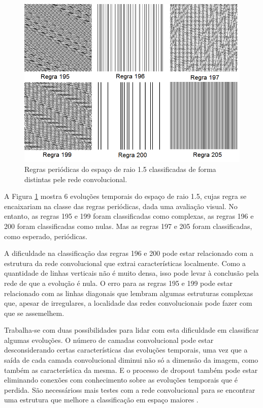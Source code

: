 \documentclass[12pt,a4paper]{report}
\begin{document}
	\begin{figure}[H]
		\centering
		\includegraphics[scale=0.75]{./img/regras_periodicas_diferentes_classificacoes.png}
		\caption{Regras periódicas do espaço de raio 1.5 classificadas de forma distintas pele rede convolucional.}
		\label{fig:PeriodicasDiferentesClassificacoes}
	\end{figure}
	
	A Figura \ref{fig:PeriodicasDiferentesClassificacoes} mostra 6 evoluções temporais do espaço de raio 1.5, cujas regra se encaixariam na classe das regras periódicas, dada uma avaliação visual. No entanto, as regras 195 e 199 foram classificadas como complexas, as regras 196 e 200 foram classificadas como nulas. Mas as regras 197 e 205 foram classificadas, como esperado, periódicas.
	
	A dificuldade na classificação das regras 196 e 200 pode estar relacionado com a estrutura da rede convolucional que extrai características localmente. Como a quantidade de linhas verticais não é muito densa, isso pode levar à conclusão pela rede de que a evolução é nula. O erro para as regras 195 e 199 pode estar relacionado com as linhas diagonais que lembram algumas estruturas complexas que, apesar de irregulares, a localidade das redes convolucionais pode fazer com que se assemelhem.
	
	Trabalha-se com duas possibilidades para lidar com esta dificuldade em classificar algumas evoluções. O número de camadas convolucional pode estar desconsiderando certas características das evoluções temporais, uma vez que a saída de cada camada convolucional diminui não só a dimensão da imagem, como também as característica da mesma. E o processo de dropout também pode estar eliminando conexões com conhecimento sobre as evoluções temporais que é perdida. São necessárioss mais testes com a rede convolucional para se encontrar uma estrutura que melhore a classificação em espaço maiores \cite{NitishSrivastavaEtAl2014}.
	
\end{document}
